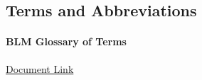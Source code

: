 
\subsection{Terms and Abbreviations}
\paragraph{BLM Glossary of Terms}
\href{../../documentation/readingRoom/geography101/BLMglossary.pdf}{Document Link}



